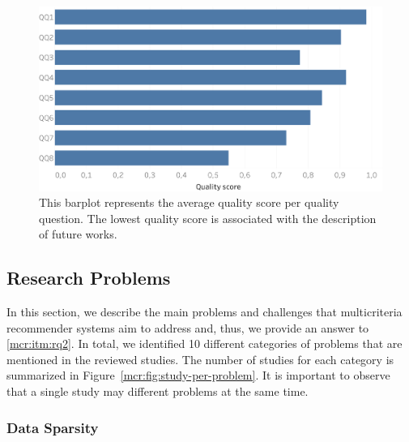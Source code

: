 \begin{figure}
\centering
\includegraphics[width=\textwidth]{quality_per_question}
\caption[Quality score per quality question]{This barplot represents the average quality score per quality question. The lowest quality score is associated with the description of future works.}
\label{mcr:fig:quality-per-question}
\end{figure}

\subsection{Research Problems}
\label{mcr:sec:problems}

In this section, we describe the main problems and challenges that multicriteria recommender systems aim to address and, thus, we provide an answer to \ref{mcr:itm:rq2}. In total, we identified 10 different categories of problems that are mentioned in the reviewed studies. The number of studies for each category is summarized in Figure~\ref{mcr:fig:study-per-problem}. It is important to observe that a single study may  different problems at the same time.

\subsubsection{Data Sparsity}

